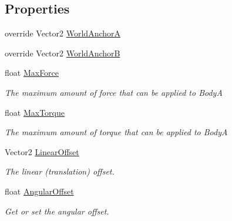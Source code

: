 \subsection*{Properties}
\begin{DoxyCompactItemize}
\item 
override Vector2 \hyperlink{class_farseer_physics_1_1_dynamics_1_1_joints_1_1_motor_joint_a87868c8580e42a737cb366c2d43e1810}{World\+Anchor\+A}
\item 
override Vector2 \hyperlink{class_farseer_physics_1_1_dynamics_1_1_joints_1_1_motor_joint_a2de0ddbd0e806836e61200eef86dc8eb}{World\+Anchor\+B}
\item 
float \hyperlink{class_farseer_physics_1_1_dynamics_1_1_joints_1_1_motor_joint_a3c925e1cf88a8d1c0a4df75c7e46af07}{Max\+Force}
\begin{DoxyCompactList}\small\item\em The maximum amount of force that can be applied to Body\+A \end{DoxyCompactList}\item 
float \hyperlink{class_farseer_physics_1_1_dynamics_1_1_joints_1_1_motor_joint_adbc6b74b1ac276d1e1838e74101b9ecb}{Max\+Torque}
\begin{DoxyCompactList}\small\item\em The maximum amount of torque that can be applied to Body\+A \end{DoxyCompactList}\item 
Vector2 \hyperlink{class_farseer_physics_1_1_dynamics_1_1_joints_1_1_motor_joint_a0183de97eccd0e558e2e068159341efc}{Linear\+Offset}
\begin{DoxyCompactList}\small\item\em The linear (translation) offset. \end{DoxyCompactList}\item 
float \hyperlink{class_farseer_physics_1_1_dynamics_1_1_joints_1_1_motor_joint_abc065261bb1090dea10246e1a7a2d9e6}{Angular\+Offset}
\begin{DoxyCompactList}\small\item\em Get or set the angular offset. \end{DoxyCompactList}\end{DoxyCompactItemize}
